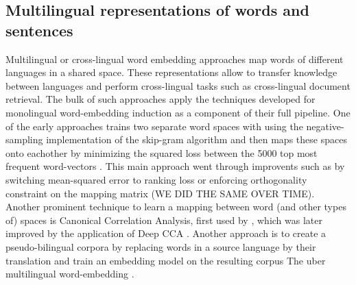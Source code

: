 \subsection{Multilingual representations of words and sentences}
Multilingual or cross-lingual word embedding approaches map words of different languages in a shared space. These representations allow to transfer knowledge between languages and
perform cross-lingual tasks such as cross-lingual document retrieval. The bulk of such approaches apply the techniques developed for monolingual word-embedding induction as a component
of their full pipeline. One of the early approaches trains two separate word spaces with using the negative-sampling implementation of the skip-gram algorithm and then maps these spaces onto eachother by minimizing the squared loss between the 5000 top most frequent word-vectors \cite{mikolov2013exploiting}. This main approach went through improvents
such as by switching mean-squared error to ranking loss \cite{lazaridou2015hubness} or enforcing orthogonality constraint on the mapping matrix
\cite{xing2015normalized}   (WE DID THE SAME OVER TIME). Another prominent technique to learn a mapping between word (and other types of) spaces is Canonical Correlation Analysis, first
used by \cite{faruqui2014improving}, which was later improved by the application of Deep CCA \cite{lu2015deep}. Another approach is to create a pseudo-bilingual corpora by replacing words
in a source language by their translation and train an embedding model on the resulting corpus
The uber multilingual word-embedding \cite{ammar2016massively}.


